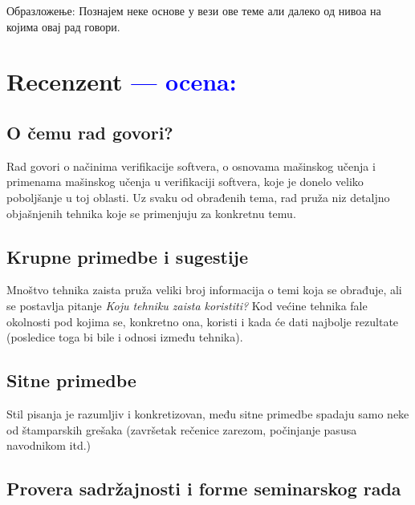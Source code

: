 \documentclass[a4paper]{report}
\newcommand{\odgovor}[1]{\textcolor{blue}{#1}}
\newcommand{\say}[1]{\textit{#1}}
\begin{document}
Образложење: Познајем неке основе у вези ове теме али далеко од нивоа на којима овај рад говори.


\chapter{Recenzent \odgovor{--- ocena:} }


\section{O čemu rad govori?}
Rad govori o načinima verifikacije softvera, o osnovama mašinskog učenja i primenama mašinskog učenja u verifikaciji softvera, koje je donelo veliko poboljšanje u toj oblasti. Uz svaku od obrađenih tema, rad pruža niz detaljno objašnjenih tehnika koje se primenjuju za konkretnu temu.

\section{Krupne primedbe i sugestije}
Mnoštvo tehnika zaista pruža veliki broj informacija o temi koja se obrađuje, ali se postavlja pitanje \say {Koju tehniku zaista koristiti?} Kod većine tehnika fale okolnosti pod kojima se, konkretno ona, koristi i kada će dati najbolje rezultate (posledice toga bi bile i odnosi između tehnika).
\section{Sitne primedbe}
Stil pisanja je razumljiv i konkretizovan, među sitne primedbe spadaju samo neke od štamparskih grešaka (završetak rečenice zarezom, počinjanje pasusa navodnikom itd.)
\section{Provera sadržajnosti i forme seminarskog rada}
\end{document}
